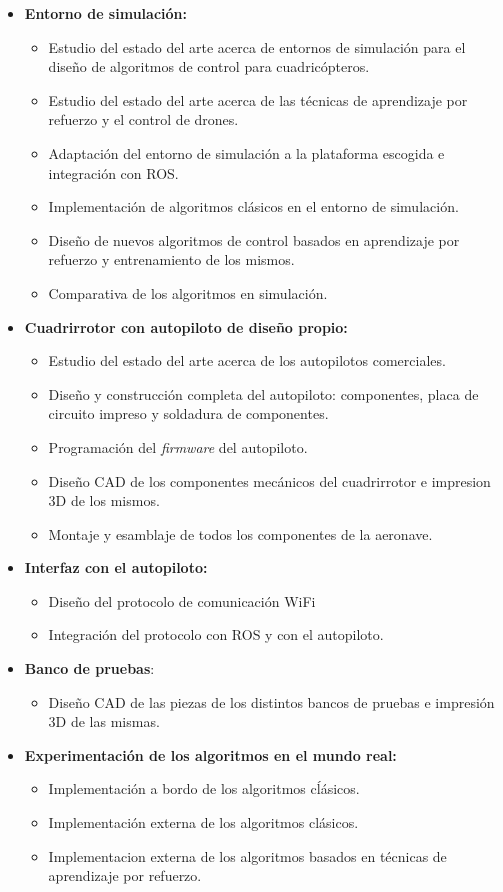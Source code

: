  \begin{itemize}
 	\item \textbf{Entorno de simulación:}
 	\begin{itemize}
 		\item Estudio del estado del arte acerca de entornos de simulación para el diseño de algoritmos de control para cuadricópteros.
 		\item Estudio del estado del arte acerca de las técnicas de aprendizaje por refuerzo y el control de drones.
 		\item Adaptación del entorno de simulación a la plataforma escogida e integración con ROS.
 		\item Implementación de algoritmos clásicos en el entorno de simulación.
 		\item Diseño de nuevos algoritmos de control basados en aprendizaje por refuerzo y entrenamiento de los mismos.
 		\item Comparativa de los algoritmos en simulación.
 	\end{itemize}
 	\item \textbf{Cuadrirrotor con autopiloto de diseño propio:}
 	\begin{itemize}
 		\item Estudio del estado del arte acerca de los autopilotos comerciales.
 		\item Diseño y construcción completa del autopiloto: componentes, placa de circuito impreso y soldadura de componentes.
 		\item Programación del \textit{firmware} del autopiloto.
 		\item Diseño CAD de los componentes mecánicos del cuadrirrotor e impresion 3D de los mismos.
 		\item Montaje y esamblaje de todos los componentes de la aeronave.  
 	\end{itemize}
 	\item \textbf{Interfaz con el autopiloto:}
 	\begin{itemize}
		\item Diseño del protocolo de comunicación WiFi
		\item Integración del protocolo con ROS y con el autopiloto.
	\end{itemize}
	\item \textbf{Banco de pruebas}:
		\begin{itemize}
			\item Diseño CAD de las piezas de los distintos bancos de pruebas e impresión 3D de las mismas. 
		\end{itemize}
	\item \textbf{Experimentación de los algoritmos en el mundo real:} 
		\begin{itemize}
			\item Implementación a bordo de los algoritmos cĺásicos.
			\item Implementación externa de los algoritmos clásicos.
			\item Implementacion externa de los algoritmos basados en técnicas de aprendizaje por refuerzo. 
		\end{itemize}
 	

 \end{itemize}
